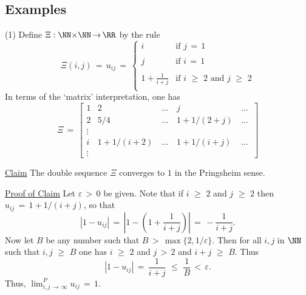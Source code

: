 {            \subsection{\small{\bf Examples}}
            \label{ExampC100.110}

\V

\hspace*{\parindent}
        (1) Define ${\Xi}:{\NN}{\times}{\NN} \,{\rightarrow}\, {\RR}$ by the rule
        \begin{displaymath}
        {\Xi}(i,j) \,=\, u_{ij} \,=\,  \left\{
        \begin{array}{cl}
        i & \mbox{if $j \,=\, 1$} \\
          &                       \\
        j & \mbox{if $i \,=\, 1$} \\
          &                       \\
        {\displaystyle 1+\frac{1}{i+j}} & \mbox{if $i\,\,{\geq}\,\,2$ and $j\,\,{\geq}\,\,2$} \\
          &
        \end{array}
                                    \right.
        \end{displaymath}
    In terms of the `matrix' interpretation, one has
        \begin{displaymath}
        {\Xi} \,=\, \left[
        \begin{array}{llclc}
        1 & 2 & \,{\ldots}\,& j & \,{\ldots}\, \\
        2 & 5/4 & \,{\ldots}\,& 1+1/(2+j) & \,{\ldots}\, \\
      {\vdots} &        &             &        &              \\
        i & 1+1/(i+2) & \,{\ldots}\,& 1+1/(i+j) & \,{\ldots}\, \\
      {\vdots} &        &             &        &
        \end{array}
                                \right]
        \end{displaymath}


        \underline{Claim} The double sequence ${\Xi}$ converges to $1$ in the Pringsheim sense.

        \underline{Proof of Claim} Let ${\varepsilon}\,>\,0$ be given. Note that if $i\,\,{\geq}\,\,2$ and $j\,\,{\geq}\,\,2$ then $u_{ij} \,=\, 1+1/(i+j)$, so that
        \begin{displaymath}
        |1-u_{ij}| \,=\, \left| 1-\left(1+\frac{1}{i+j}\right)\right| \,=\, -\frac{1}{i+j}.
        \end{displaymath}
    Now let $B$ be any number such that $B\,>\,\max\{2,1/{\varepsilon}\}$. Then for all $i,j$ in ${\NN}$ such that $i,j\,\,{\geq}\,\,B$ one has $i\,\,{\geq}\,\,2$ and $j\,>\,2$ and $i+j\,\,{\geq}\,\,B$. Thus
        \begin{displaymath}
        \left|1- u_{ij}\right| \,=\, \frac{1}{i+j}\,\,{\leq}\,\,\frac{1}{B} \,<\,{\varepsilon}.
        \end{displaymath}
    Thus, $\lim_{i,j \,{\rightarrow}\, {\infty}}^{P} u_{ij} \,=\, 1$.

}
